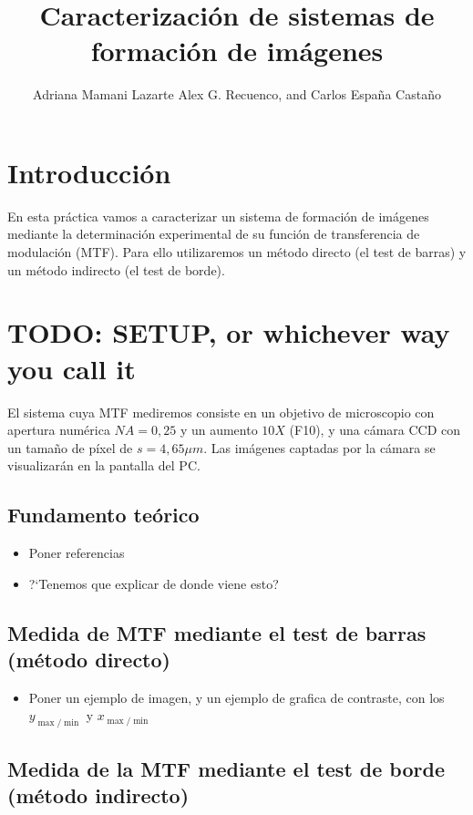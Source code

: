 \documentclass{./packages/optica-article}
\begin{document}
\title{Caracterización de sistemas de formación de imágenes}

\author{Adriana Mamani Lazarte Alex G. Recuenco, and Carlos España Castaño}

\address{Universidad Complutense de Madrid, Madrid, PC 28040, España}

\section{Introducción}
En esta práctica vamos a caracterizar un sistema de formación de imágenes mediante la determinación experimental de su función de transferencia de modulación (MTF). Para ello utilizaremos un método directo (el test de barras) y un método indirecto (el test de borde).


\section{TODO: SETUP, or whichever way you call it}

El sistema cuya MTF mediremos consiste en un objetivo de microscopio con apertura numérica $NA = 0,25$ y un aumento $10X$ (F10), y una cámara CCD con un tamaño de píxel de $s=4,65 \mu m$. Las imágenes captadas por la cámara se visualizarán en la pantalla del PC.

\subsection{Fundamento teórico}

\begin{itemize}
	\item Poner referencias
	\item ?`Tenemos que explicar de donde viene esto?
\end{itemize}


\subsection{Medida de MTF mediante el test de barras (método directo)}

\begin{itemize}
	\item Poner un ejemplo de imagen, y un ejemplo de grafica de contraste, con los $y_{\max/\min}$ y $x_{\max/\min}$

\end{itemize}

\subsection{Medida de la MTF mediante el test de borde (método indirecto)}
\end{document}
